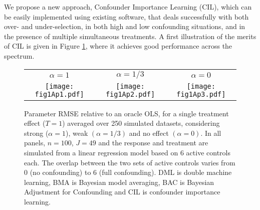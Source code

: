 \documentclass[12pt]{article}
\newcommand{\omcom}[1]{ {\color{blue} #1} }
\begin{document}
We propose a new approach, Confounder Importance Learning (CIL), which can be easily implemented using existing software, that deals successfully with both over- and under-selection, in both high and low confounding situations, and in the presence of multiple simultaneous treatments. A first illustration of the merits of CIL is given in Figure \ref{fig:intro2}, where it achieves good performance across the spectrum. %
\begin{figure}[htbp]
\centering
\begin{tabular}{ccc}
$\alpha = 1$ & $\alpha = 1/3$ & $\alpha = 0$ \\
\texttt{[image: fig1Ap1.pdf]} &
\texttt{[image: fig1Ap2.pdf]} &
\texttt{[image: fig1Ap3.pdf]}
\end{tabular}
\caption{Parameter RMSE relative to an oracle OLS,  for a single treatment effect ($T=1$)  averaged over 250 simulated datasets, considering strong ($\alpha=1$), weak $(\alpha=1/3)$ and  no effect $(\alpha=0)$.  In all panels, $n=100$, $J=49$ and the response and treatment are simulated from a linear regression model based on 6 active controls each. The overlap between the two sets of active controls varies from 0 (no confounding) to 6 (full confounding). DML is double machine learning, BMA is Bayesian model averaging, BAC is Bayesian Adjustment for Confounding and CIL is confounder importance learning.} %
\label{fig:intro2}
\end{figure}
\end{document}
